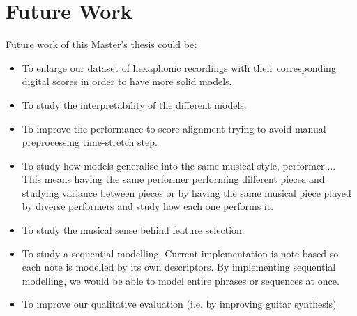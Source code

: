 \section{Future Work}
\label{sec:future}
Future work of this Master's thesis could be:
\begin{itemize}[noitemsep]
\item To enlarge our dataset of hexaphonic recordings with their corresponding digital scores in order to have more solid models. 
\item To study the interpretability of the different models.
\item To improve the performance to score alignment trying to avoid manual preprocessing time-stretch step.
\item To study how models generalise into the same musical style, performer,... This means having the same performer performing different pieces and studying variance between pieces or by having the same musical piece played by diverse performers and study how each one performs it.
\item To study the musical sense behind feature selection.
\item To study a sequential modelling. Current implementation is note-based so each note is modelled by its own descriptors. By implementing sequential modelling, we would be able to model entire phrases or sequences at once.
\item To improve our qualitative evaluation (i.e. by improving guitar synthesis)
\end{itemize}

\cleardoublepage

